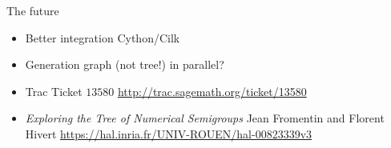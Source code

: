 \documentclass[compress,11pt]{beamer}
\begin{document}
\begin{frame}{The future}
  
  \begin{itemize}
  \item Better integration Cython/Cilk
    \bigskip

  \item Generation graph (not tree!) in parallel?
  \end{itemize}
  \bigskip  \bigskip

  \begin{itemize}
  \item Trac Ticket $13580$ \url{http://trac.sagemath.org/ticket/13580}
    \bigskip

  \item \textit{Exploring the Tree of Numerical Semigroups}
    Jean Fromentin and Florent Hivert
    \url{https://hal.inria.fr/UNIV-ROUEN/hal-00823339v3}

  \end{itemize}
\end{frame}
\end{document}
